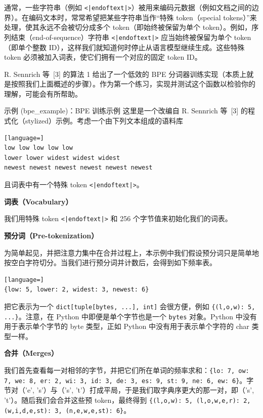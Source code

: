 通常，一些字符串（例如 \texttt{<|endoftext|>}）被用来编码元数据（例如文档之间的边界）。在编码文本时，常常希望把某些字符串当作“特殊 token（special tokens）”来处理，使其永远不会被切分成多个 token（即始终被保留为单个 token）。例如，序列结束（end-of-sequence）字符串 \texttt{<|endoftext|>} 应当始终被保留为单个 token（即单个整数 ID），这样我们就知道何时停止从语言模型继续生成。这些特殊 token 必须被加入词表，使它们拥有一个对应的固定 token ID。

R. Sennrich 等 \,[3] 的算法 1 给出了一个低效的 BPE 分词器训练实现（本质上就是按照我们上面概述的步骤）。作为第一个练习，实现并测试这个函数以检验你的理解，可能会有所帮助。

\begin{problembox}{示例 (bpe\_example)：BPE 训练示例}
这里是一个改编自 R. Sennrich 等 \,[3] 的程式化（stylized）示例。考虑一个由下列文本组成的语料库

\begin{lstlisting}[language=]
low low low low low
lower lower widest widest widest
newest newest newest newest newest newest
\end{lstlisting}

且词表中有一个特殊 token \texttt{<|endoftext|>}。

\medskip
\textbf{词表（Vocabulary）}

我们用特殊 token \texttt{<|endoftext|>} 和 256 个字节值来初始化我们的词表。

\medskip
\textbf{预分词（Pre-tokenization）}

为简单起见，并把注意力集中在合并过程上，本示例中我们假设预分词只是简单地按空白字符切分。当我们进行预分词并计数后，会得到如下频率表。

\begin{lstlisting}[language=]
{low: 5, lower: 2, widest: 3, newest: 6}
\end{lstlisting}

把它表示为一个 \texttt{dict[tuple[bytes, ...], int]} 会很方便，例如 \texttt{\{(l,o,w): 5, ...\}}。注意，在 Python 中即便是单个字节也是一个 \texttt{bytes} 对象。Python 中没有用于表示单个字节的 byte 类型，正如 Python 中没有用于表示单个字符的 char 类型一样。

\medskip
\textbf{合并（Merges）}

我们首先查看每一对相邻的字节，并把它们所在单词的频率求和：\texttt{\{lo: 7, ow: 7, we: 8, er: 2, wi: 3, id: 3, de: 3, es: 9, st: 9, ne: 6, ew: 6\}}。字节对（'e', 's'）与（'s', 't'）打成平局，于是我们取字典序更大的那一对，即（'s', 't'）。随后我们会合并这些预 token，最终得到 \texttt{\{(l,o,w): 5, (l,o,w,e,r): 2, (w,i,d,e,st): 3, (n,e,w,e,st): 6\}}。


\end{problembox}
